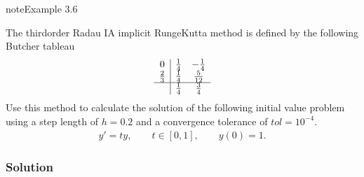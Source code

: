 \documentclass[letterpaper,10pt,english]{jupyterBook}
\begin{document}
\begin{sphinxadmonition}{note}{Example 3.6}

\sphinxAtStartPar
The third\sphinxhyphen{}order Radau IA implicit Runge\sphinxhyphen{}Kutta method is defined by the following Butcher tableau
\begin{align*}
   \begin{array}{c|cc}
      0 & \frac{1}{4} & -\frac{1}{4} \\
      \frac{2}{3} & \frac{1}{4} & \frac{5}{12} \\ \hline
      & \frac{1}{4} & \frac{3}{4}
    \end{array}
\end{align*}
\sphinxAtStartPar
Use this method to calculate the solution of the following initial value problem using a step length of \(h=0.2\) and a convergence tolerance of \(tol=10^{-4}\).
\begin{align*}
    y' = ty, \qquad t\in [0,1], \qquad y(0)=1.
\end{align*}\subsubsection*{Solution}


\end{sphinxadmonition}
\end{document}
